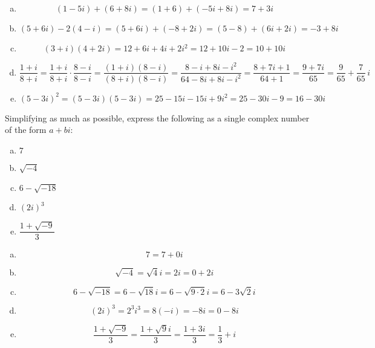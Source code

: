 \documentclass[11pt,letterpaper]{article}
\begin{document}
\sol
\begin{enumerate}[(a)]
\item 
	\[
	(1 - 5i) + (6 + 8i)= (1 + 6) + (-5i + 8i)= 7 + 3i
	\] \pspace

\item 
	\[
	(5 + 6i) - 2(4 - i)= (5 + 6i) + (-8 + 2i)= (5 - 8) + (6i + 2i)= -3 + 8i
	\] \pspace

\item 
	\[
	(3 + i)(4 + 2i)= 12 + 6i + 4i + 2i^2= 12 + 10i - 2= 10 + 10i
	\] \pspace

\item 
	\[
	\dfrac{1 + i}{8 + i}= \dfrac{1 + i}{8 + i} \cdot \dfrac{8 - i}{8 - i}= \dfrac{(1 + i)(8 - i)}{(8 + i)(8 - i)}= \dfrac{8 - i + 8i - i^2}{64 - 8i + 8i - i^2}= \dfrac{8 + 7i + 1}{64 + 1}= \dfrac{9 + 7i}{65}= \frac{9}{65} + \frac{7}{65}\,i
	\] \pspace

\item 
	\[
	(5 - 3i)^2= (5 - 3i)(5 - 3i)= 25 - 15i -15i + 9i^2= 25 - 30i - 9= 16 - 30i
	\]
\end{enumerate}



\newpage



 Simplifying as much as possible, express the following as a single complex number of the form $a + bi$:
\begin{enumerate}[(a)]
\item $7$
\item $\sqrt{-4}$
\item $6 - \sqrt{-18}$
\item $(2i)^3$
\item $\dfrac{1 + \sqrt{-9}}{3}$
\end{enumerate} \pspace

\sol
\begin{enumerate}[(a)]
\item 
	\[
	7= 7 + 0i
	\] \pspace

\item 
	\[
	\sqrt{-4}= \sqrt{4} i= 2i= 0 + 2i
	\] \pspace

\item 
	\[
	6 - \sqrt{-18}= 6 - \sqrt{18}i= 6 - \sqrt{9 \cdot 2}i= 6 - 3\sqrt{2}i
	\] \pspace

\item 
	\[
	(2i)^3= 2^3 i^3= 8(-i)= -8i= 0 - 8i
	\] \pspace

\item 
	\[
	\dfrac{1 + \sqrt{-9}}{3}= \dfrac{1 + \sqrt{9}i}{3}= \dfrac{1 + 3i}{3}= \frac{1}{3} + i
	\]
\end{enumerate}
\end{document}
